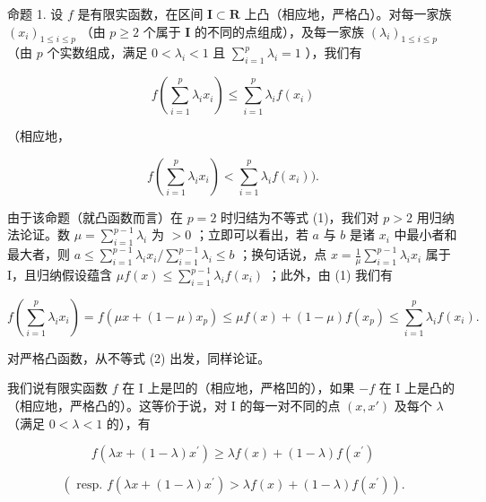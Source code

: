 命题 1. 设 \(f\) 是有限实函数，在区间 \(\mathbf{I} \subset \mathbf{R}\) 上凸（相应地，严格凸）。对每一家族 \((x_i)_{1 \leqslant i \leqslant p}\) （由 \(p \geqslant 2\) 个属于 \(\mathbf{I}\) 的不同的点组成），及每一家族 \((\lambda_i)_{1 \leqslant i \leqslant p}\) （由 \(p\) 个实数组成，满足 \(0 < \lambda_i < 1\) 且 \(\sum_{i=1}^{p} \lambda_i = 1\) ），我们有

\[
f \left(\sum_ {i = 1} ^ {p} \lambda_ {i} x _ {i}\right) \leqslant \sum_ {i = 1} ^ {p} \lambda_ {i} f (x _ {i})\tag{3}
\]

（相应地，

\[
f \left(\sum_ {i = 1} ^ {p} \lambda_ {i} x _ {i}\right) <   \sum_ {i = 1} ^ {p} \lambda_ {i} f (x _ {i})).\tag{4}
\]

由于该命题（就凸函数而言）在 \(p = 2\) 时归结为不等式 (1)，我们对 \(p > 2\) 用归纳法论证。数 \(\mu = \sum_{i=1}^{p-1} \lambda_i\) 为 \(> 0\) ；立即可以看出，若 \(a\) 与 \(b\) 是诸 \(x_i\) 中最小者和最大者，则 \(a \leqslant \sum_{i=1}^{p-1} \lambda_i x_i / \sum_{i=1}^{p-1} \lambda_i \leqslant b\) ；换句话说，点 \(x = \frac{1}{\mu} \sum_{i=1}^{p-1} \lambda_i x_i\) 属于 I，且归纳假设蕴含 \(\mu f(x) \leqslant \sum_{i=1}^{p-1} \lambda_i f(x_i)\) ；此外，由 (1) 我们有

\[
f \left(\sum_ {i = 1} ^ {p} \lambda_ {i} x _ {i}\right) = f (\mu x + (1 - \mu) x _ {p}) \leqslant \mu f (x) + (1 - \mu) f (x _ {p}) \leqslant \sum_ {i = 1} ^ {p} \lambda_ {i} f (x _ {i}).
\]

对严格凸函数，从不等式 (2) 出发，同样论证。

我们说有限实函数 \(f\) 在 I 上是凹的（相应地，严格凹的），如果 \(-f\) 在 I 上是凸的（相应地，严格凸的）。这等价于说，对 I 的每一对不同的点 \((x, x')\) 及每个 \(\lambda\) （满足 \(0 < \lambda < 1\) 的），有

\[
f (\lambda x + (1 - \lambda) x ^ {\prime}) \geqslant \lambda f (x) + (1 - \lambda) f (x ^ {\prime})
\]

\[
(\text { resp. } f (\lambda x + (1 - \lambda) x ^ {\prime}) > \lambda f (x) + (1 - \lambda) f (x ^ {\prime})).
\]

